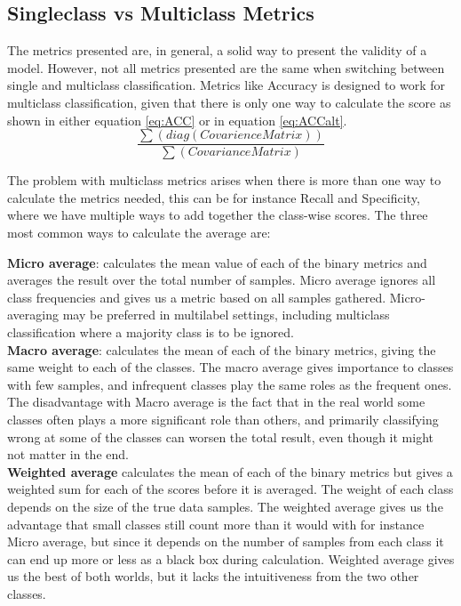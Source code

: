\subsection{Singleclass vs Multiclass Metrics}

The metrics presented are, in general, a solid way to present the validity of a model. However, not all metrics presented are the same when switching between single and multiclass classification.  Metrics like Accuracy is designed to work for multiclass classification, given that there is only one way to calculate the score as shown in either equation \ref{eq:ACC} or in equation \ref{eq:ACCalt}.
\begin{equation}
\frac{\sum (diag(Covarience Matrix))}{\sum(Covariance Matrix)}
\label{eq:ACCalt}
\end{equation}

The problem with multiclass metrics arises when there is more than one way to calculate the metrics needed, this can be for instance Recall and Specificity, where we have multiple ways to add together the class-wise scores. The three most common ways to calculate the average are:

\textbf{Micro average}: calculates the mean value of each of the binary metrics and averages the result over the total number of samples. 
Micro average ignores all class frequencies and gives us a metric based on all samples gathered. Micro-averaging may be preferred in multilabel settings, including multiclass classification where a majority class is to be ignored.\\

\textbf{Macro average}: calculates the mean of each of the binary metrics, giving the same weight to each of the classes. The macro average gives importance to classes with few samples, and infrequent classes play the same roles as the frequent ones. The disadvantage with Macro average is the fact that in the real world some classes often plays a more significant role than others, and primarily classifying wrong at some of the classes can worsen the total result, even though it might not matter in the end. \\

\textbf{Weighted average} calculates the mean of each of the binary metrics but gives a weighted sum for each of the scores before it is averaged. 
The weight of each class depends on the size of the true data samples.
The weighted average gives us the advantage that small classes still count more than it would with for instance Micro average, but since it depends on the number of samples from each class it can end up more or less as a black box during calculation.
Weighted average gives us the best of both worlds, but it lacks the intuitiveness from the two other classes. \\

